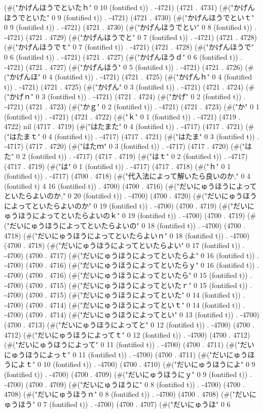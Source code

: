 (#("かげんほうでといたｈ" 0 10 (fontified t)) . -4721) (4721 . 4731) (#("かげんほうでといた" 0 9 (fontified t)) . -4721) (4721 . 4730) (#("かげんほうでといｔ" 0 9 (fontified t)) . -4721) (4721 . 4730) (#("かげんほうでとい" 0 8 (fontified t)) . -4721) (4721 . 4729) (#("かげんほうでと" 0 7 (fontified t)) . -4721) (4721 . 4728) (#("かげんほうでｔ" 0 7 (fontified t)) . -4721) (4721 . 4728) (#("かげんほうで" 0 6 (fontified t)) . -4721) (4721 . 4727) (#("かげんほうｄ" 0 6 (fontified t)) . -4721) (4721 . 4727) (#("かげんほう" 0 5 (fontified t)) . -4721) (4721 . 4726) (#("かげんほ" 0 4 (fontified t)) . -4721) (4721 . 4725) (#("かげんｈ" 0 4 (fontified t)) . -4721) (4721 . 4725) (#("かげん" 0 3 (fontified t)) . -4721) (4721 . 4724) (#("かげｎ" 0 3 (fontified t)) . -4721) (4721 . 4724) (#("かげ" 0 2 (fontified t)) . -4721) (4721 . 4723) (#("かｇ" 0 2 (fontified t)) . -4721) (4721 . 4723) (#("か" 0 1 (fontified t)) . -4721) (4721 . 4722) (#("ｋ" 0 1 (fontified t)) . -4721) (4719 . 4722) nil (4717 . 4719) (#("はたまた" 0 4 (fontified t)) . -4717) (4717 . 4721) (#("はたまｔ" 0 4 (fontified t)) . -4717) (4717 . 4721) (#("はたま" 0 3 (fontified t)) . -4717) (4717 . 4720) (#("はたｍ" 0 3 (fontified t)) . -4717) (4717 . 4720) (#("はた" 0 2 (fontified t)) . -4717) (4717 . 4719) (#("はｔ" 0 2 (fontified t)) . -4717) (4717 . 4719) (#("は" 0 1 (fontified t)) . -4717) (4717 . 4718) (#("ｈ" 0 1 (fontified t)) . -4717) (4700 . 4718) (#("代入法によって解いたら良いのか," 0 4 (fontified t) 4 16 (fontified t)) . 4700) (4700 . 4716) (#("だいにゅうほうによってといたらよいのか," 0 20 (fontified t)) . -4700) (4700 . 4720) (#("だいにゅうほうによってといたらよいのか" 0 19 (fontified t)) . -4700) (4700 . 4719) (#("だいにゅうほうによってといたらよいのｋ" 0 19 (fontified t)) . -4700) (4700 . 4719) (#("だいにゅうほうによってといたらよいの" 0 18 (fontified t)) . -4700) (4700 . 4718) (#("だいにゅうほうによってといたらよいｎ" 0 18 (fontified t)) . -4700) (4700 . 4718) (#("だいにゅうほうによってといたらよい" 0 17 (fontified t)) . -4700) (4700 . 4717) (#("だいにゅうほうによってといたらよ" 0 16 (fontified t)) . -4700) (4700 . 4716) (#("だいにゅうほうによってといたらｙ" 0 16 (fontified t)) . -4700) (4700 . 4716) (#("だいにゅうほうによってといたら" 0 15 (fontified t)) . -4700) (4700 . 4715) (#("だいにゅうほうによってといたｒ" 0 15 (fontified t)) . -4700) (4700 . 4715) (#("だいにゅうほうによってといた" 0 14 (fontified t)) . -4700) (4700 . 4714) (#("だいにゅうほうによってといｔ" 0 14 (fontified t)) . -4700) (4700 . 4714) (#("だいにゅうほうによってとい" 0 13 (fontified t)) . -4700) (4700 . 4713) (#("だいにゅうほうによってと" 0 12 (fontified t)) . -4700) (4700 . 4712) (#("だいにゅうほうによってｔ" 0 12 (fontified t)) . -4700) (4700 . 4712) (#("だいにゅうほうによって" 0 11 (fontified t)) . -4700) (4700 . 4711) (#("だいにゅうほうによっｔ" 0 11 (fontified t)) . -4700) (4700 . 4711) (#("だいにゅうほうによｔ" 0 10 (fontified t)) . -4700) (4700 . 4710) (#("だいにゅうほうによ" 0 9 (fontified t)) . -4700) (4700 . 4709) (#("だいにゅうほうにｙ" 0 9 (fontified t)) . -4700) (4700 . 4709) (#("だいにゅうほうに" 0 8 (fontified t)) . -4700) (4700 . 4708) (#("だいにゅうほうｎ" 0 8 (fontified t)) . -4700) (4700 . 4708) (#("だいにゅうほう" 0 7 (fontified t)) . -4700) (4700 . 4707) (#("だいにゅうほ" 0 6 